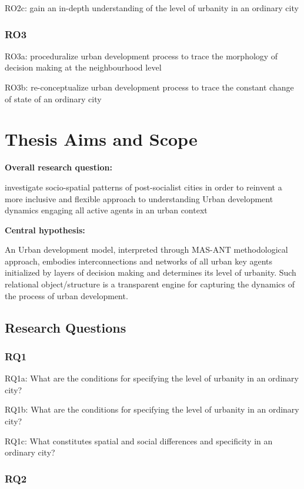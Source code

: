 \documentclass[11pt]{report}
\begin{document}
RO2c: gain an in-depth understanding of the level of urbanity in an ordinary city

\subsubsection{RO3}

RO3a: proceduralize urban development process to trace the morphology of decision making at the neighbourhood level

RO3b: re-conceptualize urban development process
to trace the constant change of state of an ordinary city

\section{Thesis Aims and Scope}

\textbf{Overall research question:}

investigate socio-spatial patterns of  post-socialist cities in order to reinvent a more inclusive and flexible approach to understanding Urban development dynamics engaging all active agents in an urban context 

\textbf{Central hypothesis:}

An Urban development model, interpreted through MAS-ANT methodological approach, embodies interconnections and networks of all urban key agents initialized by layers of decision making and determines its level of urbanity.
Such relational object/structure is a transparent engine for capturing the dynamics of the process of urban development. 

\subsection{Research Questions}

\subsubsection{RQ1}

RQ1a: What are the conditions for specifying the level of urbanity in an ordinary city?

RQ1b: What are the conditions for specifying the level of urbanity in an ordinary city?

RQ1c: What constitutes spatial and social differences and specificity in an ordinary city?

\subsubsection{RQ2}
\end{document}
